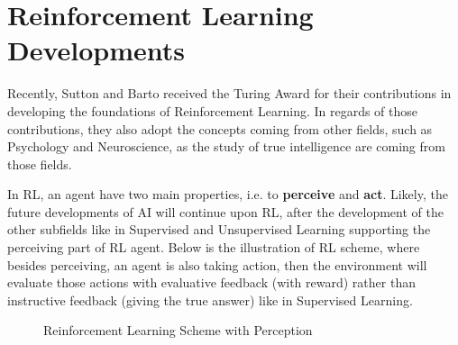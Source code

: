 \usetikzlibrary{arrows, positioning, fit}

\section{Reinforcement Learning Developments}

Recently, Sutton and Barto received the Turing Award for their contributions in developing the foundations of Reinforcement Learning. In regards of those contributions, they also adopt the concepts coming from other fields, such as Psychology and Neuroscience, as the study of true intelligence are coming from those fields. 

In RL, an agent have two main properties, i.e. to \textbf{perceive} and \textbf{act}. Likely, the future developments of AI will continue upon RL, after the development of the other subfields like in Supervised and Unsupervised Learning supporting the perceiving part of RL agent. Below is the illustration of RL scheme, where besides perceiving, an agent is also taking action, then the environment will evaluate those actions with evaluative feedback (with reward) rather than instructive feedback (giving the true answer) like in Supervised Learning.
\begin{figure}[h]
    \centering
    \caption{Reinforcement Learning Scheme with Perception}
    \label{fig:rl_scheme}
\end{figure}